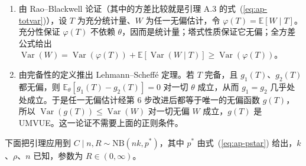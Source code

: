 \begin{enumerate}
\item 由 Rao--Blackwell 论证（其中的方差比较就是引理 A.3 的式~(\ref{eq:ap-totvar})），设 $T$ 为充分统计量、$W$ 为任一无偏估计，令 $\varphi(T)=\mathbb{E}[W\mid T]$。充分性保证 $\varphi(T)$ 不依赖 $\theta$，因而是统计量；塔式性质保证它无偏；全方差公式给出 $\operatorname{Var}(W)=\operatorname{Var}(\varphi(T))+\mathbb{E}[\operatorname{Var}(W\mid T)]\ge\operatorname{Var}(\varphi(T))$。
\item 由完备性的定义推出 Lehmann--Scheffé 定理。若 $T$ 完备，且 $g_1(T)$、$g_2(T)$ 都无偏，则 $\mathbb{E}_\theta[g_1(T)-g_2(T)]=0$ 对一切 $\theta$ 成立，从而 $g_1=g_2$ 几乎处处成立。于是任一无偏估计经第 6 步改进后都等于唯一的无偏函数 $g(T)$，所以 $\operatorname{Var}(g(T))\le\operatorname{Var}(W)$ 对一切无偏 $W$ 成立，$g(T)$ 是 UMVUE。这一论证不需要上面的正则条件。
\end{enumerate}

下面把引理应用到 $C\mid n,R\sim\mathrm{NB}(nk,p^*)$，其中 $p^*$ 由式~(\ref{eq:ap-pstar}) 给出，$k$、$\rho$、$n$ 已知，参数为 $R\in(0,\infty)$。

